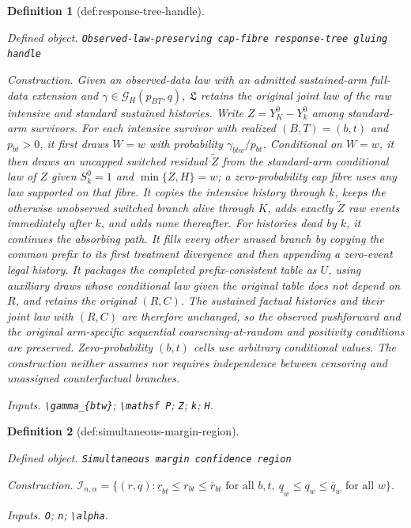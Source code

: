 \documentclass{article}
\newtheorem{definition}{Definition}
\begin{document}
\begin{definition}[def:response-tree-handle]\label{def:response-tree-handle}
\par\smallskip\noindent\emph{Defined object.} \texttt{Observed-\allowbreak{}law-\allowbreak{}preserving cap-\allowbreak{}fibre response-\allowbreak{}tree gluing handle}
\par\smallskip\noindent\emph{Construction.} Given an observed-data law with an admitted sustained-arm full-data extension and \(\gamma\in\mathcal G_H(p_{BT},q)\), \(\mathfrak L\) retains the original joint law of the raw intensive and standard sustained histories. Write \(Z=Y_K^0-Y_k^0\) among standard-arm survivors. For each intensive survivor with realized \((B,T)=(b,t)\) and \(p_{bt}>0\), it first draws \(W=w\) with probability \(\gamma_{btw}/p_{bt}\). Conditional on \(W=w\), it then draws an uncapped switched residual \(\widetilde Z\) from the standard-arm conditional law of \(Z\) given \(S_k^0=1\) and \(\min\{Z,H\}=w\); a zero-probability cap fibre uses any law supported on that fibre. It copies the intensive history through \(k\), keeps the otherwise unobserved switched branch alive through \(K\), adds exactly \(\widetilde Z\) raw events immediately after \(k\), and adds none thereafter. For histories dead by \(k\), it continues the absorbing path. It fills every other unused branch by copying the common prefix to its first treatment divergence and then appending a zero-event legal history. It packages the completed prefix-consistent table as \(U\), using auxiliary draws whose conditional law given the original table does not depend on \(R\), and retains the original \((R,C)\). The sustained factual histories and their joint law with \((R,C)\) are therefore unchanged, so the observed pushforward and the original arm-specific sequential coarsening-at-random and positivity conditions are preserved. Zero-probability \((b,t)\) cells use arbitrary conditional values. The construction neither assumes nor requires independence between censoring and unassigned counterfactual branches.
\par\smallskip\noindent\emph{Inputs.} \texttt{\textbackslash{}\allowbreak{}gamma\_\allowbreak{}\{btw\}\allowbreak{}}; \texttt{\textbackslash{}\allowbreak{}mathsf P}; \texttt{Z}; \texttt{k}; \texttt{H}.
\end{definition}

\begin{definition}[def:simultaneous-margin-region]\label{def:simultaneous-margin-region}
\par\smallskip\noindent\emph{Defined object.} \texttt{Simultaneous margin confidence region}
\par\smallskip\noindent\emph{Construction.} \(\mathcal I_{n,\alpha}=\{(r,q):\underline r_{bt}\le r_{bt}\le\overline r_{bt}\text{ for all }b,t,\ \underline q_w\le q_w\le\overline q_w\text{ for all }w\}\).
\par\smallskip\noindent\emph{Inputs.} \texttt{O}; \texttt{n}; \texttt{\textbackslash{}\allowbreak{}alpha}.
\end{definition}
\end{document}
